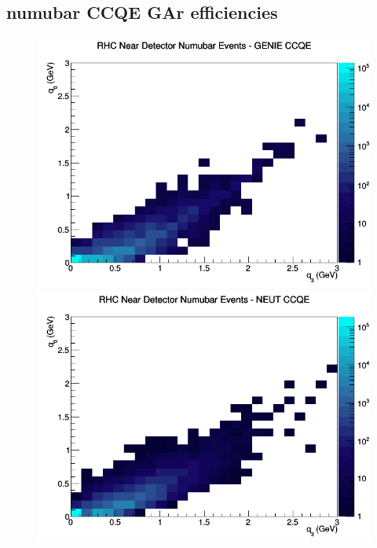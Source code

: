 \documentclass[12pt]{article}
\begin{document}
\subsection{numubar CCQE GAr efficiencies}
\begin{figure}[h]
\includegraphics[width=\linewidth]{eff_q0_q3/GAr/CCQE_RHC_ND_numubar_q3_q0_GENIE.png}
\endminipage
{}
\includegraphics[width=\linewidth]{eff_q0_q3/GAr/CCQE_RHC_ND_numubar_q3_q0_NEUT.png}
\endminipage
{}

\end{figure}
\end{document}
